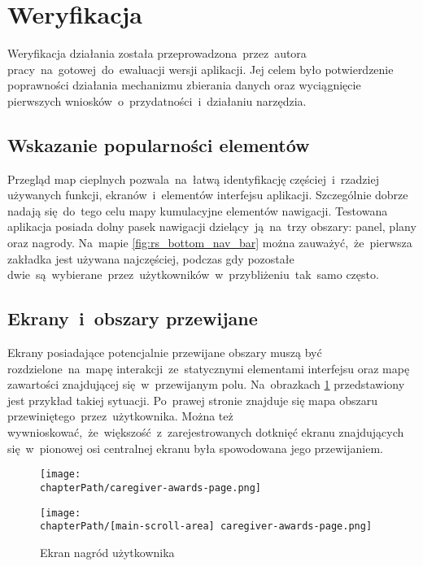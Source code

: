 \section{Weryfikacja}
Weryfikacja działania została przeprowadzona~przez~autora pracy~na~gotowej~do~ewaluacji wersji aplikacji. Jej celem było potwierdzenie poprawności działania mechanizmu zbierania danych oraz wyciągnięcie pierwszych wniosków~o~przydatności~i~działaniu narzędzia.

\subsection{Wskazanie popularności elementów}
Przegląd map cieplnych pozwala~na~łatwą identyfikację częściej~i~rzadziej używanych funkcji, ekranów~i~elementów interfejsu aplikacji. Szczególnie dobrze nadają się~do~tego celu mapy kumulacyjne elementów nawigacji. Testowana aplikacja posiada dolny pasek nawigacji dzielący~ją~na~trzy obszary: panel, plany oraz nagrody. Na~mapie \ref{fig:rs_bottom_nav_bar} można zauważyć,~że~pierwsza zakładka jest używana najczęściej, podczas gdy pozostałe dwie~są~wybierane~przez~użytkowników~w~przybliżeniu~tak~samo często.

\bigskip
{}

\subsection{Ekrany~i~obszary przewijane}
Ekrany posiadające potencjalnie przewijane obszary muszą być rozdzielone~na~mapę interakcji~ze~statycznymi elementami interfejsu oraz mapę zawartości znajdującej się~w~przewijanym polu. Na~obrazkach \ref{fig:rs_panel_parts} przedstawiony jest przykład takiej sytuacji. Po~prawej stronie znajduje się mapa obszaru przewiniętego~przez~użytkownika. Można też wywnioskować,~że~większość~z~zarejestrowanych dotknięć ekranu znajdujących się~w~pionowej osi centralnej ekranu była spowodowana jego przewijaniem. 

\bigskip
\begin{figure}[H]
\centering
\begin{minipage}{.35\textwidth}
	\centering
	\texttt{[image: \\chapterPath/caregiver-awards-page.png]}
\end{minipage}
\begin{minipage}{.33\textwidth}
	\centering
	\texttt{[image: \\chapterPath/[main-scroll-area] caregiver-awards-page.png]}
\end{minipage}
\bigskip
\caption{Ekran nagród użytkownika}
\label{fig:rs_panel_parts}
\end{figure}

